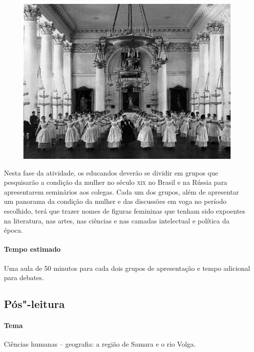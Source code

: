 \documentclass{article}
\begin{document}
\begin{figure}[ht!]
\includegraphics[width=\textwidth]{./images/PNLD0049-15.png}
\end{figure}

Nesta fase da atividade, os educandos deverão se dividir em grupos que
pesquisarão a condição da mulher no século \textsc{xix} no Brasil e na Rússia
para apresentarem seminários aos colegas. Cada um dos grupos, além de
apresentar um panorama da condição da mulher e das discussões em voga no
período escolhido, terá que trazer nomes de figuras femininas que tenham
sido expoentes na literatura, nas artes, nas ciências e nas camadas
intelectual e política da época.

\paragraph{Tempo estimado} Uma aula de 50 minutos para cada dois grupos de
apresentação e tempo adicional para debates.

\subsection{Pós"-leitura}

\paragraph{Tema} Ciências humanas -- geografia: a região de Samara e o rio Volga.

\end{document}
